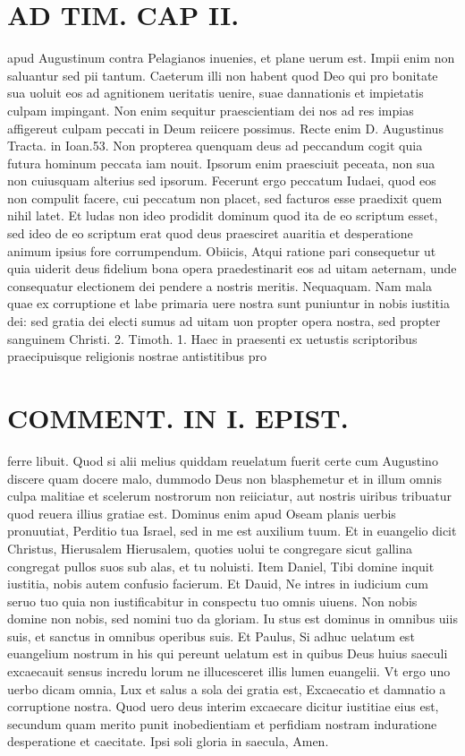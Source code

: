 \documentclass{article}
\begin{document}
\begin{pages}
\section*{AD TIM. CAP II. }
\marginpar{[ p.115 ]}\pstart apud Augustinum contra Pelagianos inuenies, et plane uerum est. Impii enim non saluantur sed pii tantum. Caeterum illi non habent quod Deo qui pro bonitate sua uoluit eos ad agnitionem ueritatis uenire, suae dannationis et impietatis culpam impingant. Non enim sequitur praescientiam dei nos ad res impias affigereut culpam peccati in Deum reiicere possimus. Recte enim D. Augustinus Tracta. in Ioan.53. Non propterea quenquam deus ad peccandum cogit quia futura hominum peccata iam nouit. Ipsorum enim praesciuit peceata, non sua non cuiusquam alterius sed ipsorum. Fecerunt ergo peccatum Iudaei, quod eos non compulit facere, cui peccatum non placet, sed facturos esse praedixit quem nihil latet. Et ludas non ideo prodidit dominum quod ita de eo scriptum esset, sed ideo de eo scriptum erat quod deus praesciret auaritia et desperatione animum ipsius fore corrumpendum. Obiicis, Atqui ratione pari consequetur ut quia uiderit deus fidelium bona opera praedestinarit eos ad uitam aeternam, unde consequatur electionem dei pendere a nostris meritis. Nequaquam. Nam mala quae ex corruptione et labe primaria uere nostra sunt puniuntur in nobis iustitia dei: sed gratia dei electi sumus ad uitam uon propter opera nostra, sed propter sanguinem Christi. 2. Timoth. 1. Haec in praesenti ex uetustis scriptoribus praecipuisque religionis nostrae antistitibus pro  \pend
\section*{COMMENT. IN I. EPIST. }\pstart ferre libuit. Quod si alii melius quiddam reuelatum fuerit certe cum Augustino discere quam docere malo, dummodo Deus non blasphemetur et in illum omnis culpa malitiae et scelerum nostrorum non reiiciatur, aut nostris uiribus tribuatur quod reuera illius gratiae est. Dominus enim apud Oseam planis uerbis pronuutiat, Perditio tua Israel, sed in me est auxilium tuum. Et in euangelio dicit Christus, Hierusalem Hierusalem, quoties uolui te congregare sicut gallina congregat pullos suos sub alas, et tu noluisti. Item Daniel, Tibi domine inquit iustitia, nobis autem confusio facierum. Et Dauid, Ne intres in iudicium cum seruo tuo quia non iustificabitur in conspectu tuo omnis uiuens. Non nobis domine non nobis, sed nomini tuo da gloriam. Iu stus est dominus in omnibus uiis suis, et sanctus in omnibus operibus suis. Et Paulus, Si adhuc uelatum est euangelium nostrum in his qui pereunt uelatum est in quibus Deus huius saeculi excaecauit sensus incredu lorum ne illucesceret illis lumen euangelii. Vt ergo uno uerbo dicam omnia, Lux et salus a sola dei gratia est, Excaecatio et damnatio a corruptione nostra. Quod uero deus interim excaecare dicitur iustitiae eius est, secundum quam merito punit inobedientiam et perfidiam nostram induratione desperatione et caecitate. Ipsi soli gloria in saecula, Amen.  \pend

\end{pages}
\end{document}
